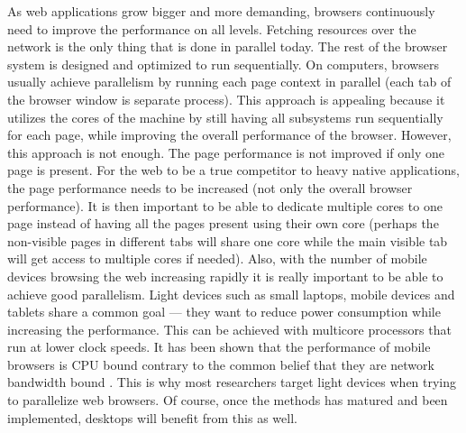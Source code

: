 \documentclass[a4paper,11pt]{kth-mag}
\newcommand\abbr[2][]{\uppercase{#2}\ifthenelse{\equal{#1}{}}%
                     {}{#1}}
\begin{document}
        As web applications grow bigger and more demanding, browsers continuously need to improve the performance on all levels.
        Fetching resources over the network is the only thing that is done in parallel today.
        The rest of the browser system is designed and optimized to run sequentially.
        On computers, browsers usually achieve parallelism by running each page context in parallel (each tab of the browser window is separate process).
        This approach is appealing because it utilizes the cores of the machine by still having all subsystems run sequentially for each page, while improving the overall performance of the browser.
        However, this approach is not enough.
        The page performance is not improved if only one page is present.
        For the web to be a true competitor to heavy native applications, the page performance needs to be increased (not only the overall browser performance).
        It is then important to be able to dedicate multiple cores to one page instead of having all the pages present using their own core (perhaps the non-visible pages in different tabs will share one core while the main visible tab will get access to multiple cores if needed).
        Also, with the number of mobile devices browsing the web increasing rapidly it is really important to be able to achieve good parallelism.
        Light devices such as small laptops, mobile devices and tablets share a common goal --- they want to reduce power consumption while increasing the performance.
        This can be achieved with multicore processors that run at lower clock speeds.
        It has been shown that the performance of mobile browsers is \abbr{cpu} bound contrary to the common belief that they are network bandwidth bound \cite{parallelizing_the_web_browser}.
        This is why most researchers target light devices when trying to parallelize web browsers.
        Of course, once the methods has matured and been implemented, desktops will benefit from this as well.
\end{document}
